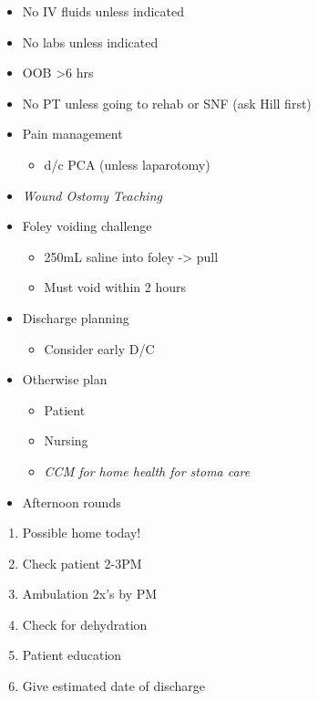 \documentclass[
]{book}
\providecommand{\tightlist}{%
  \setlength{\itemsep}{0pt}\setlength{\parskip}{0pt}}
\begin{document}
\begin{itemize}
\tightlist
\item
  No IV fluids unless indicated
\item
  No labs unless indicated
\item
  OOB \textgreater6 hrs
\item
  No PT unless going to rehab or SNF (ask Hill first)
\item
  Pain management

  \begin{itemize}
  \tightlist
  \item
    d/c PCA (unless laparotomy)
  \end{itemize}
\item
  \emph{Wound Ostomy Teaching}
\item
  Foley voiding challenge

  \begin{itemize}
  \tightlist
  \item
    250mL saline into foley -\textgreater{} pull
  \item
    Must void within 2 hours
  \end{itemize}
\item
  Discharge planning

  \begin{itemize}
  \tightlist
  \item
    Consider early D/C
  \end{itemize}
\item
  Otherwise plan

  \begin{itemize}
  \tightlist
  \item
    Patient
  \item
    Nursing
  \item
    \emph{CCM for home health for stoma care}
  \end{itemize}
\item
  Afternoon rounds
\end{itemize}

\begin{enumerate}
\def\labelenumi{\arabic{enumi})}
\tightlist
\item
  Possible home today!
\item
  Check patient 2-3PM
\item
  Ambulation 2x's by PM
\item
  Check for dehydration
\item
  Patient education
\item
  Give estimated date of discharge
\end{enumerate}
\end{document}
